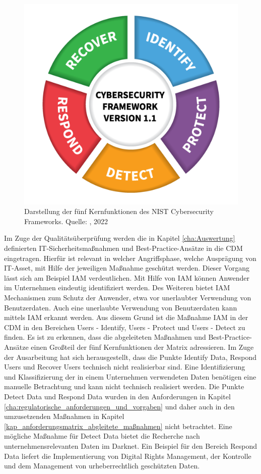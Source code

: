 \begin{figure}[H]
    \centering
  \includegraphics[scale=0.1]{images/uploads/a_figure_11.png}
  \caption{Darstellung der fünf Kernfunktionen des NIST Cybersecurity Frameworks. Quelle: \textcite{NIST}, 2022}
  \label{fig:NIST-Framework}
\end{figure}
\bigbreak
Im Zuge der Qualitätsüberprüfung werden die in Kapitel \ref{cha:Auswertung} definierten IT-Sicherheitsmaßnahmen und Best-Practice-Ansätze in die CDM eingetragen. Hierfür ist relevant in welcher Angriffsphase, welche Ausprägung von IT-Asset, mit Hilfe der jeweiligen Maßnahme geschützt werden. Dieser Vorgang lässt sich am Beispiel IAM verdeutlichen. Mit Hilfe von IAM können Anwender im Unternehmen eindeutig identifiziert werden. Des Weiteren bietet IAM Mechanismen zum Schutz der Anwender, etwa vor unerlaubter Verwendung von Benutzerdaten. Auch eine unerlaubte Verwendung von Benutzerdaten kann mittels IAM erkannt werden. Aus diesem Grund ist die Maßnahme IAM in der CDM in den Bereichen \glqq{}Users - Identify\grqq{}, \glqq{}Users - Protect\grqq{} und \glqq{}Users - Detect\grqq{} zu finden. 
\bigbreak
Es ist zu erkennen, dass die abgeleiteten Maßnahmen und Best-Practice-Ansätze einen Großteil der fünf Kernfunktionen der Matrix adressieren. Im Zuge der Ausarbeitung hat sich herausgestellt, dass die Punkte \glqq{}Identify Data\grqq{}, \glqq{}Respond Users\grqq{} und \glqq{}Recover Users\grqq{} technisch nicht realisierbar sind. Eine Identifizierung und Klassifizierung der in einem Unternehmen verwendeten Daten benötigen eine manuelle Betrachtung und kann nicht technisch realisiert werden. Die Punkte \glqq{}Detect Data\grqq{} und \glqq{}Respond Data\grqq{} wurden in den Anforderungen in Kapitel \ref{cha:regulatorische_anforderungen_und_vorgaben} und daher auch in den umzusetzenden Maßnahmen in Kapitel \ref{kap_anforderungsmatrix_abgleitete_maßnahmen} nicht betrachtet. Eine mögliche Maßnahme für \glqq{}Detect Data\grqq{} bietet die Recherche nach unternehmensrelevanten Daten im Darknet. Ein Beispiel für den Bereich \glqq{}Respond Data\grqq{} liefert die Implementierung von \glqq{}Digital Rights Management\grqq{}, der Kontrolle und dem Management von urheberrechtlich geschützten Daten. 

